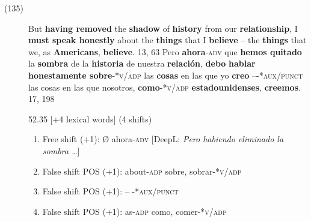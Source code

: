\documentclass[output=paper]{langsci/langscibook}
\begin{document}
\begin{description}
  \item[(135)] But \textbf{having removed} the \textbf{shadow} of \textbf{history} from our \textbf{relationship}, I \textbf{must speak honestly} about the \textbf{things} that I \textbf{believe} -- the \textbf{things} that we, as \textbf{Americans}, \textbf{believe}. 13, 63 \rightarrow Pero \textbf{ahora}\textsc{-adv} que \textbf{hemos quitado} la \textbf{sombra} de la \textbf{historia} de nuestra \textbf{relación}, \textbf{debo} \textbf{hablar honestamente sobre}-*\textsc{v/adp} las\textbf{ cosas} en las que yo \textbf{creo} {--}-\textsc{*aux/punct} las cosas en las que nosotros, \textbf{como}-*\textsc{v/adp}\textbf{ estadounidenses}, \textbf{creemos}. 17, 198

    52.35 [+4 lexical words] (4 shifts)

    \begin{enumerate}
      \item Free shift (+1): Ø \rightarrow ahora\textsc{-adv} [DeepL: \textit{Pero habiendo eliminado la sombra \dots}]
      \item False shift POS (+1): about-\textsc{adp} \rightarrow sobre, sobrar-*\textsc{v/adp}
      \item False shift POS (+1): -- \rightarrow {--}-\textsc{*aux/punct}
      \item False shift POS (+1): as-\textsc{adp} \rightarrow como, comer-*\textsc{v/adp}
    \end{enumerate}
\end{description}
\end{document}
